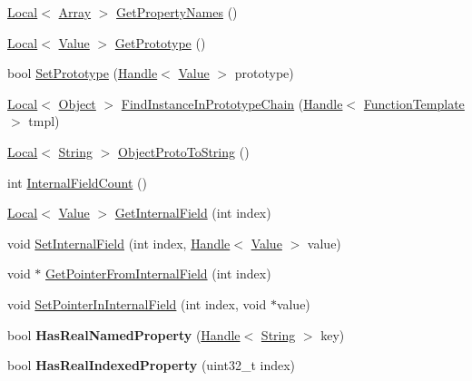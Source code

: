 \begin{DoxyCompactItemize}
\item 
\hyperlink{classv8_1_1_local}{Local}$<$ \hyperlink{classv8_1_1_array}{Array} $>$ \hyperlink{classv8_1_1_object_a9f45786246c6e6027b32f685d900a41f}{Get\+Property\+Names} ()
\item 
\hyperlink{classv8_1_1_local}{Local}$<$ \hyperlink{classv8_1_1_value}{Value} $>$ \hyperlink{classv8_1_1_object_ae8d3fed7d6dbd667c29cabb3039fe7af}{Get\+Prototype} ()
\item 
bool \hyperlink{classv8_1_1_object_ab54bbd70d60e62d8bc22a8c8a6be593e}{Set\+Prototype} (\hyperlink{classv8_1_1_handle}{Handle}$<$ \hyperlink{classv8_1_1_value}{Value} $>$ prototype)
\item 
\hyperlink{classv8_1_1_local}{Local}$<$ \hyperlink{classv8_1_1_object}{Object} $>$ \hyperlink{classv8_1_1_object_ab2c5f7369abf08ae8f44dc84f5aa335a}{Find\+Instance\+In\+Prototype\+Chain} (\hyperlink{classv8_1_1_handle}{Handle}$<$ \hyperlink{classv8_1_1_function_template}{Function\+Template} $>$ tmpl)
\item 
\hyperlink{classv8_1_1_local}{Local}$<$ \hyperlink{classv8_1_1_string}{String} $>$ \hyperlink{classv8_1_1_object_aeb2f524c806075e5f9032a24afd86869}{Object\+Proto\+To\+String} ()
\item 
int \hyperlink{classv8_1_1_object_aaec28576353eebe6fee113bce2718ecc}{Internal\+Field\+Count} ()
\item 
\hyperlink{classv8_1_1_local}{Local}$<$ \hyperlink{classv8_1_1_value}{Value} $>$ \hyperlink{classv8_1_1_object_aa3324fdf652d8ac3b2f27faa0559231d}{Get\+Internal\+Field} (int index)
\item 
void \hyperlink{classv8_1_1_object_a361b1781e7db29b17b063ef31315989e}{Set\+Internal\+Field} (int index, \hyperlink{classv8_1_1_handle}{Handle}$<$ \hyperlink{classv8_1_1_value}{Value} $>$ value)
\item 
void $\ast$ \hyperlink{classv8_1_1_object_a8ef1f3e0d4f4cecc54d5e0248bc45694}{Get\+Pointer\+From\+Internal\+Field} (int index)
\item 
void \hyperlink{classv8_1_1_object_a697c8b6945ab4cb4bf468414bb4c1234}{Set\+Pointer\+In\+Internal\+Field} (int index, void $\ast$value)
\item 
\hypertarget{classv8_1_1_object_a5c29998a9ec60802b052f528a1aaa7fd}{}bool {\bfseries Has\+Real\+Named\+Property} (\hyperlink{classv8_1_1_handle}{Handle}$<$ \hyperlink{classv8_1_1_string}{String} $>$ key)\label{classv8_1_1_object_a5c29998a9ec60802b052f528a1aaa7fd}

\item 
\hypertarget{classv8_1_1_object_a29dce0e7da968dae54614501f035f7e9}{}bool {\bfseries Has\+Real\+Indexed\+Property} (uint32\+\_\+t index)\label{classv8_1_1_object_a29dce0e7da968dae54614501f035f7e9}


\end{DoxyCompactItemize}
